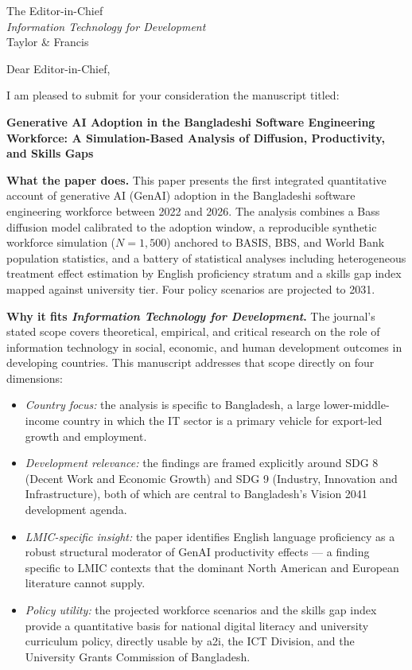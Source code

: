\documentclass[12pt,a4paper]{letter}
\begin{document}
\begin{letter}{The Editor-in-Chief\\
               \textit{Information Technology for Development}\\
               Taylor \& Francis}

\opening{Dear Editor-in-Chief,}

I am pleased to submit for your consideration the manuscript titled:

\begin{center}
\textbf{Generative AI Adoption in the Bangladeshi Software Engineering
Workforce: A Simulation-Based Analysis of Diffusion, Productivity,
and Skills Gaps}
\end{center}

\textbf{What the paper does.}
This paper presents the first integrated quantitative account of
generative AI (GenAI) adoption in the Bangladeshi software engineering
workforce between 2022 and 2026. The analysis combines a Bass diffusion
model calibrated to the adoption window, a reproducible synthetic
workforce simulation ($N = 1{,}500$) anchored to BASIS, BBS, and World
Bank population statistics, and a battery of statistical analyses
including heterogeneous treatment effect estimation by English
proficiency stratum and a skills gap index mapped against university
tier. Four policy scenarios are projected to 2031.

\textbf{Why it fits \textit{Information Technology for Development}.}
The journal's stated scope covers theoretical, empirical, and critical
research on the role of information technology in social, economic,
and human development outcomes in developing countries. This manuscript
addresses that scope directly on four dimensions:
\begin{itemize}
  \item \textit{Country focus:} the analysis is specific to Bangladesh,
    a large lower-middle-income country in which the IT sector is a
    primary vehicle for export-led growth and employment.
  \item \textit{Development relevance:} the findings are framed
    explicitly around SDG 8 (Decent Work and Economic Growth) and
    SDG 9 (Industry, Innovation and Infrastructure), both of which are
    central to Bangladesh's Vision 2041 development agenda.
  \item \textit{LMIC-specific insight:} the paper identifies English
    language proficiency as a robust structural moderator of GenAI
    productivity effects --- a finding specific to LMIC contexts that
    the dominant North American and European literature cannot supply.
  \item \textit{Policy utility:} the projected workforce scenarios and
    the skills gap index provide a quantitative basis for national
    digital literacy and university curriculum policy, directly usable
    by a2i, the ICT Division, and the University Grants Commission
    of Bangladesh.
\end{itemize}


\end{letter}
\end{document}
